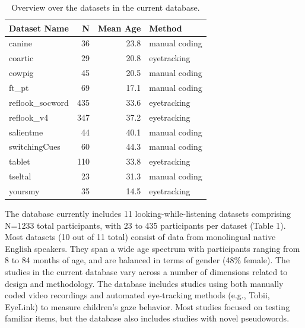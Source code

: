\documentclass[10pt, letterpaper]{article}
\begin{document}
\begin{table}[H]
\centering
\begingroup\fontsize{9pt}{10pt}\selectfont
\begin{tabular}{lrrl}
  \hline
Dataset Name & N & Mean Age & Method \\ 
  \hline
canine & 36 & 23.8 & manual coding \\ 
  coartic & 29 & 20.8 & eyetracking \\ 
  cowpig & 45 & 20.5 & manual coding \\ 
  ft\_pt & 69 & 17.1 & manual coding \\ 
  reflook\_socword & 435 & 33.6 & eyetracking \\ 
  reflook\_v4 & 347 & 37.2 & eyetracking \\ 
  salientme & 44 & 40.1 & manual coding \\ 
  switchingCues & 60 & 44.3 & manual coding \\ 
  tablet & 110 & 33.8 & eyetracking \\ 
  tseltal & 23 & 31.3 & manual coding \\ 
  yoursmy & 35 & 14.5 & eyetracking \\ 
   \hline
\end{tabular}
\endgroup
\caption{Overview over the datasets in the current database.} 
\end{table}

The database currently includes 11 looking-while-listening datasets
comprising N=1233 total participants, with 23 to 435 participants per
dataset (Table 1). Most datasets (10 out of 11 total) consist of data
from monolingual native English speakers. They span a wide age spectrum
with participants ranging from 8 to 84 months of age, and are balanced
in terms of gender (48\% female). The studies in the current database
vary across a number of dimensions related to design and methodology.
The database includes studies using both manually coded video recordings
and automated eye-tracking methods (e.g., Tobii, EyeLink) to measure
children's gaze behavior. Most studies focused on testing familiar
items, but the database also includes studies with novel pseudowords.
\end{document}

